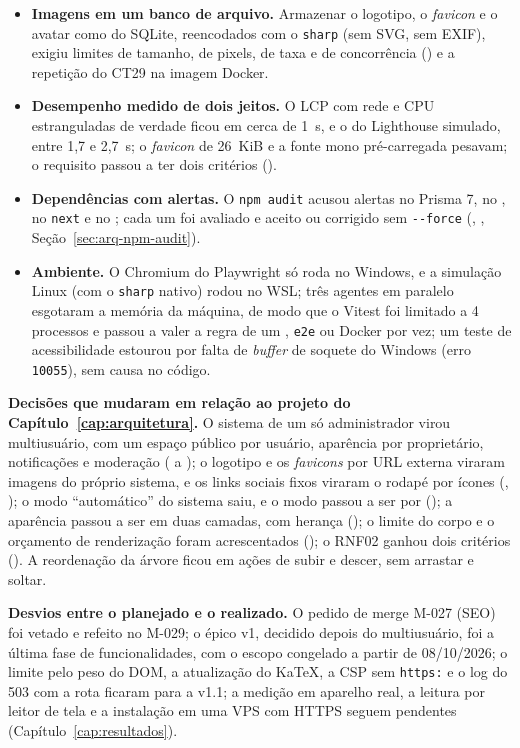 \begin{itemize}
  \item \textbf{Imagens em um banco de arquivo.} Armazenar o logotipo, o \emph{favicon} e o avatar como  do SQLite, reencodados com o \texttt{sharp} (sem SVG, sem EXIF), exigiu limites de tamanho, de pixels, de taxa e de concorrência () e a repetição do CT29 na imagem Docker.
  \item \textbf{Desempenho medido de dois jeitos.} O LCP com rede e CPU estranguladas de verdade ficou em cerca de 1~s, e o do Lighthouse simulado, entre 1,7 e 2,7~s; o \emph{favicon} de 26~KiB e a fonte mono pré-carregada pesavam; o requisito passou a ter dois critérios ().
  \item \textbf{Dependências com alertas.} O \texttt{npm audit} acusou alertas no Prisma 7, no , no \texttt{next} e no ; cada um foi avaliado e aceito ou corrigido sem \texttt{-{}-force} (, , Seção~\ref{sec:arq-npm-audit}).
  \item \textbf{Ambiente.} O Chromium do Playwright só roda no Windows, e a simulação Linux (com o \texttt{sharp} nativo) rodou no WSL; três agentes em paralelo esgotaram a memória da máquina, de modo que o Vitest foi limitado a 4 processos e passou a valer a regra de um , \texttt{e2e} ou Docker por vez; um teste de acessibilidade estourou por falta de \emph{buffer} de soquete do Windows (erro \texttt{10055}), sem causa no código.
\end{itemize}

\textbf{Decisões que mudaram em relação ao projeto do Capítulo~\ref{cap:arquitetura}.} O sistema de um só administrador virou multiusuário, com um espaço público por usuário, aparência por proprietário, notificações e moderação ( a ); o logotipo e os \emph{favicons} por URL externa viraram imagens do próprio sistema, e os links sociais fixos viraram o rodapé por ícones (, ); o modo ``automático'' do sistema saiu, e o modo passou a ser por  (); a aparência passou a ser em duas camadas, com herança (); o limite do corpo e o orçamento de renderização foram acrescentados (); o RNF02 ganhou dois critérios (). A reordenação da árvore ficou em ações de subir e descer, sem arrastar e soltar.

\textbf{Desvios entre o planejado e o realizado.} O pedido de merge M-027 (SEO) foi vetado e refeito no M-029; o épico v1, decidido depois do multiusuário, foi a última fase de funcionalidades, com o escopo congelado a partir de 08/10/2026; o limite pelo peso do DOM, a atualização do KaTeX, a CSP sem \texttt{https:} e o log do 503 com a rota ficaram para a v1.1; a medição em aparelho real, a leitura por leitor de tela e a instalação em uma VPS com HTTPS seguem pendentes (Capítulo~\ref{cap:resultados}).

